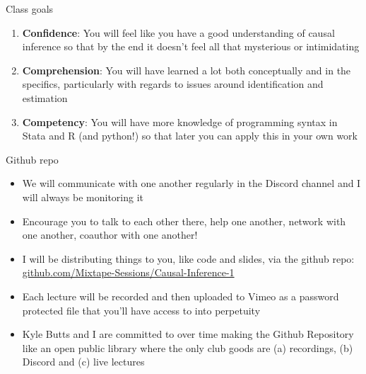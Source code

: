 \documentclass{beamer}
\begin{document}
\begin{frame}{Class goals}

  \begin{enumerate}
    \item \textbf{Confidence}: You will feel like you have a good understanding of causal inference so that by the end it doesn't feel all that mysterious or intimidating
    \item \textbf{Comprehension}: You will have learned a lot both conceptually and in the specifics, particularly with regards to issues around identification and estimation
    \item \textbf{Competency}: You will have more knowledge of programming syntax in Stata and R (and python!) so that later you can apply this in your own work
  \end{enumerate}

\end{frame}







\begin{frame}{Github repo}

  \begin{itemize}
    \item We will communicate with one another regularly in the Discord channel and I will always be monitoring it
    \item Encourage you to talk to each other there, help one another, network with one another, coauthor with one another!
    \item I will be distributing things to you, like code and slides, via the github repo: \url{github.com/Mixtape-Sessions/Causal-Inference-1}
    \item Each lecture will be recorded and then uploaded to Vimeo as a password protected file that you'll have access to into perpetuity
    \item Kyle Butts and I are committed to over time making the Github Repository like an open public library where the only club goods are (a) recordings, (b) Discord and (c) live lectures
  \end{itemize}

\end{frame}
\end{document}
